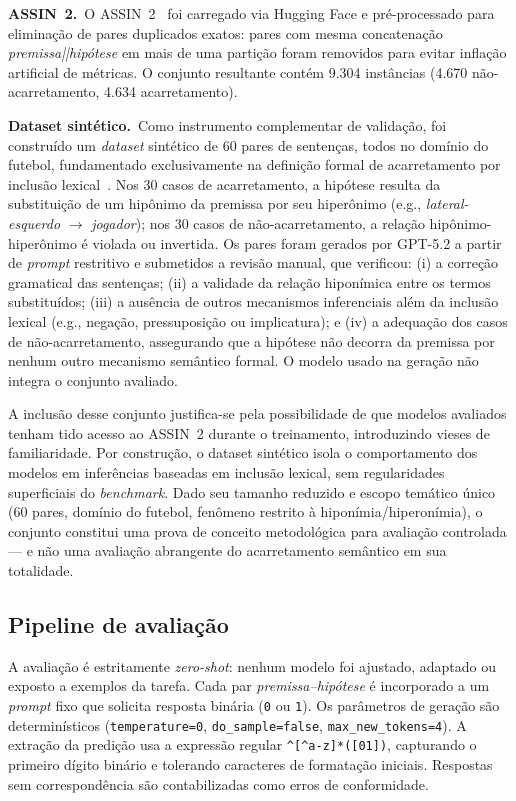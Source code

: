 \documentclass[12pt]{article}
\begin{document}
\textbf{ASSIN~2.}\ O ASSIN~2~\cite{real2020assin} foi carregado via Hugging
Face e pré-processado para eliminação de pares duplicados exatos: pares com
mesma concatenação \emph{premissa||hipótese} em mais de uma partição foram
removidos para evitar inflação artificial de métricas. O conjunto resultante
contém 9.304 instâncias (4.670 não-acarretamento, 4.634 acarretamento).

\textbf{Dataset sintético.}\ Como instrumento complementar de validação, foi
construído um \emph{dataset} sintético de 60 pares de sentenças, todos no
domínio do futebol, fundamentado exclusivamente na definição formal de
acarretamento por inclusão lexical~\cite{Ferreira2019}. Nos 30 casos de
acarretamento, a hipótese resulta da substituição de um hipônimo da premissa
por seu hiperônimo (e.g., \emph{lateral-esquerdo} $\to$ \emph{jogador}); nos
30 casos de não-acarretamento, a relação hipônimo-hiperônimo é violada ou
invertida. Os pares foram gerados por GPT-5.2 a partir de \emph{prompt}
restritivo e submetidos a revisão manual, que verificou: (i) a correção
gramatical das sentenças; (ii) a validade da relação hiponímica entre os
termos substituídos; (iii) a ausência de outros mecanismos inferenciais além
da inclusão lexical (e.g., negação, pressuposição ou implicatura); e (iv) a
adequação dos casos de não-acarretamento, assegurando que a hipótese não
decorra da premissa por nenhum outro mecanismo semântico formal. O modelo
usado na geração não integra o conjunto avaliado.

A inclusão desse conjunto justifica-se pela possibilidade de que modelos
avaliados tenham tido acesso ao ASSIN~2 durante o treinamento, introduzindo
vieses de familiaridade. Por construção, o dataset sintético isola o
comportamento dos modelos em inferências baseadas em inclusão lexical, sem
regularidades superficiais do \emph{benchmark}. Dado seu tamanho reduzido e
escopo temático único (60 pares, domínio do futebol, fenômeno restrito à
hiponímia/hiperonímia), o conjunto constitui uma prova de conceito
metodológica para avaliação controlada --- e não uma avaliação abrangente do
acarretamento semântico em sua totalidade.

\subsection{Pipeline de avaliação}

A avaliação é estritamente \emph{zero-shot}: nenhum modelo foi ajustado,
adaptado ou exposto a exemplos da tarefa. Cada par \emph{premissa--hipótese}
é incorporado a um \emph{prompt} fixo que solicita resposta binária
(\texttt{0} ou \texttt{1}). Os parâmetros de geração são determinísticos
(\texttt{temperature=0}, \texttt{do\_sample=false}, \texttt{max\_new\_tokens=4}).
A extração da predição usa a expressão regular \verb|^[^a-z]*([01])|, capturando
o primeiro dígito binário e tolerando caracteres de formatação iniciais.
Respostas sem correspondência são contabilizadas como erros de conformidade.
\end{document}
